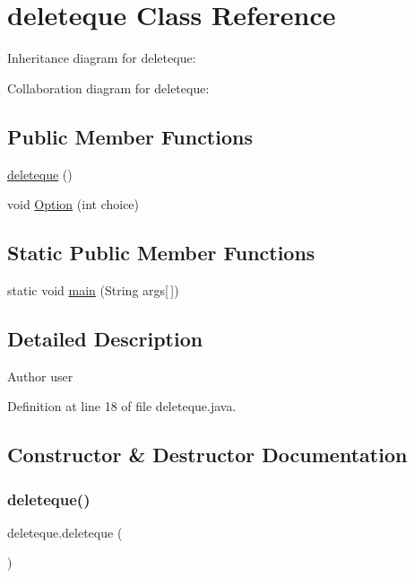 \hypertarget{classdeleteque}{}\section{deleteque Class Reference}
\label{classdeleteque}


Inheritance diagram for deleteque\+:


Collaboration diagram for deleteque\+:
\subsection*{Public Member Functions}
\begin{DoxyCompactItemize}
\item 
\mbox{\hyperlink{classdeleteque_ae9d3fac16725d3848acc91f8eab0eec5}{deleteque}} ()
\item 
void \mbox{\hyperlink{classdeleteque_a02bcbd1b4cd9a0de2b33aee34e5c102b}{Option}} (int choice)
\end{DoxyCompactItemize}
\subsection*{Static Public Member Functions}
\begin{DoxyCompactItemize}
\item 
static void \mbox{\hyperlink{classdeleteque_a5cad2fb99254daf5d9049ce984b85e5d}{main}} (String args\mbox{[}$\,$\mbox{]})
\end{DoxyCompactItemize}


\subsection{Detailed Description}
\begin{DoxyAuthor}{Author}
user 
\end{DoxyAuthor}


Definition at line 18 of file deleteque.\+java.



\subsection{Constructor \& Destructor Documentation}
\mbox{\label{classdeleteque_ae9d3fac16725d3848acc91f8eab0eec5}} 
\subsubsection{\texorpdfstring{deleteque()}{deleteque()}}
{\footnotesize\ttfamily deleteque.\+deleteque (\begin{DoxyParamCaption}{ }\end{DoxyParamCaption})}

